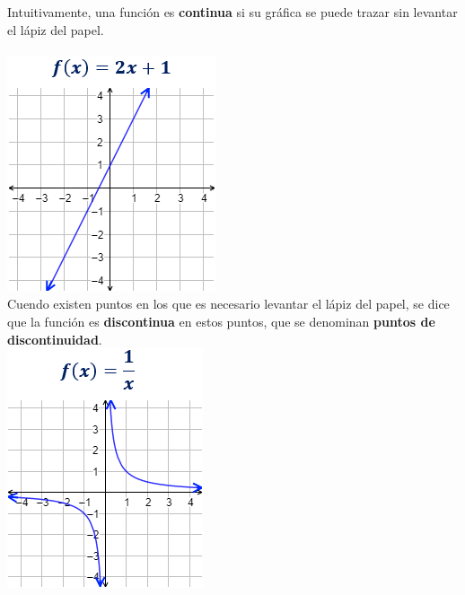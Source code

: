 

Intuitivamente, una función es \textbf{continua} si su gráfica se puede trazar sin levantar el lápiz del papel.\\
\\
\includegraphics{samples/propiedades/funcionContinua.jpg}\\

Cuendo existen puntos en los que es necesario levantar el lápiz del papel, se dice que la función es \textbf{discontinua} en estos puntos, que se denominan \textbf{puntos de discontinuidad}.\\
\includegraphics{samples/propiedades/funcionDiscontinua.jpg}

